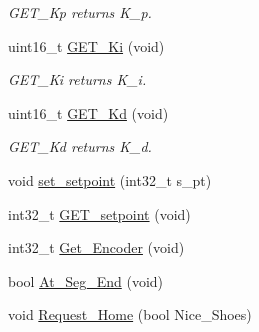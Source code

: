 \begin{DoxyCompactItemize}
\begin{DoxyCompactList}\small\item\em G\-E\-T\-\_\-\-Kp returns K\-\_\-p. \end{DoxyCompactList}\item 
\hypertarget{classtask___p_i_d_a3e065d324a3f296cf32297370a6026c4}{uint16\-\_\-t \hyperlink{classtask___p_i_d_a3e065d324a3f296cf32297370a6026c4}{G\-E\-T\-\_\-\-Ki} (void)}\label{classtask___p_i_d_a3e065d324a3f296cf32297370a6026c4}

\begin{DoxyCompactList}\small\item\em G\-E\-T\-\_\-\-Ki returns K\-\_\-i. \end{DoxyCompactList}\item 
\hypertarget{classtask___p_i_d_a5ed698383876a6968310bac2f70f78f9}{uint16\-\_\-t \hyperlink{classtask___p_i_d_a5ed698383876a6968310bac2f70f78f9}{G\-E\-T\-\_\-\-Kd} (void)}\label{classtask___p_i_d_a5ed698383876a6968310bac2f70f78f9}

\begin{DoxyCompactList}\small\item\em G\-E\-T\-\_\-\-Kd returns K\-\_\-d. \end{DoxyCompactList}\item 
void \hyperlink{classtask___p_i_d_a5112215d3f09f07c8269724417b81232}{set\-\_\-setpoint} (int32\-\_\-t s\-\_\-pt)
\item 
int32\-\_\-t \hyperlink{classtask___p_i_d_abb3876eab56d800fa45d99b77d0fed40}{G\-E\-T\-\_\-setpoint} (void)
\item 
int32\-\_\-t \hyperlink{classtask___p_i_d_a3df066e30232d9262cffe00a209aa838}{Get\-\_\-\-Encoder} (void)
\item 
bool \hyperlink{classtask___p_i_d_abb2aa5643b7c4909d930dfb281a6eaa2}{At\-\_\-\-Seg\-\_\-\-End} (void)
\item 
void \hyperlink{classtask___p_i_d_a5d79acbd155902dc1a10d1968f4c6050}{Request\-\_\-\-Home} (bool Nice\-\_\-\-Shoes)
\end{DoxyCompactItemize}
